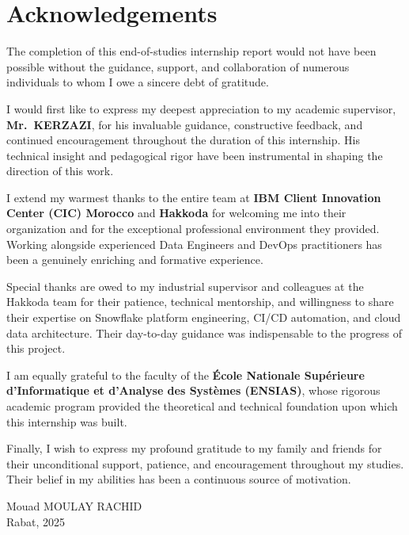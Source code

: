 \chapter*{Acknowledgements}

The completion of this end-of-studies internship report would not have been possible without the guidance, support, and collaboration of numerous individuals to whom I owe a sincere debt of gratitude.

I would first like to express my deepest appreciation to my academic supervisor, \textbf{Mr.\ KERZAZI}, for his invaluable guidance, constructive feedback, and continued encouragement throughout the duration of this internship. His technical insight and pedagogical rigor have been instrumental in shaping the direction of this work.

I extend my warmest thanks to the entire team at \textbf{IBM Client Innovation Center (CIC) Morocco} and \textbf{Hakkoda} for welcoming me into their organization and for the exceptional professional environment they provided. Working alongside experienced Data Engineers and DevOps practitioners has been a genuinely enriching and formative experience.

Special thanks are owed to my industrial supervisor and colleagues at the Hakkoda team for their patience, technical mentorship, and willingness to share their expertise on Snowflake platform engineering, CI/CD automation, and cloud data architecture. Their day-to-day guidance was indispensable to the progress of this project.

I am equally grateful to the faculty of the \textbf{École Nationale Supérieure d'Informatique et d'Analyse des Systèmes (ENSIAS)}, whose rigorous academic program provided the theoretical and technical foundation upon which this internship was built.

Finally, I wish to express my profound gratitude to my family and friends for their unconditional support, patience, and encouragement throughout my studies. Their belief in my abilities has been a continuous source of motivation.

\vspace{1cm}
\begin{flushright}
  Mouad MOULAY RACHID\\
  Rabat, 2025
\end{flushright}
\newpage
